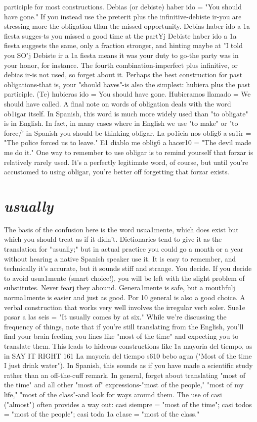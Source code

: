 \documentclass[14pt,a4paper,oneside]{memoir}
\begin{document}
{{{{participle for most constructions. Debias (or debiste) haber ido =
"You should have gone." If you instead use the preterit plus the infinitive-debiste ir-you are stressing more the obligation tllan the
missed opportunity. Debias haber ido a 1a fiesta sugges-ts you missed a
good time at the partYj Debiste haber ido a 1a fiesta suggests the same,
only a fraction stronger, and hinting maybe at "I told you SO"j Debiste
ir a 1a fiesta means it was your duty to go-the party was in your
honor, for instance. The fourth combination-imperfect plus infinitive, or debias ir-is not used, so forget about it. Perhaps the best construction for past obligations-that is, your "should haves"-is also
the simplest: hubiera plus the past participle. (Te) hubieras ido = You
should have gone. Hubieramos llamado = We should have called.
A final note on words of obligation deals with the word ob1igar itself. In Spanish, this word is much more widely used than "to
obligate" is in English. In fact, in many cases where in English we use
"to make" or "to force/' in Spanish you should be thinking obligar. La
po1icia nos oblig6 a sa1ir = "The police forced us to leave." E1 diablo
me oblig6 a hacer10 = "The devil made me do it." One way to remember to use obligar is to remind yourself that forzar is relatively rarely
used. It's a perfectly legitimate word, of course, but until you're accustomed to using obligar, you're better off forgetting that forzar exists.

\section{\emph{usually}}

The basis of the confusion here is the word usua1mente,
which does exist but which you should treat as if it didn't. Dictionaries tend to give it as the translation for "usually;" but in actual practice you could go a month or a year without hearing a native Spanish
speaker use it. It is easy to remember, and technically it's accurate, but
it sounds stiff and strange. You decide.
If you decide to avoid usua1mente (smart choice!), you will be
left with the slight problem of substitutes. Never fearj they abound.
Genera1mente is safe, but a mouthfulj norma1mente is easier and just
as good. Por 10 general is also a good choice. A verbal construction that
works very well involves the irregular verb soler. Sue1e pasar a las seis
= "It usually comes by at six."
While we're discussing the frequency of things, note that if
you're still translating from the English, you'll find your brain feeding
you lines like "most of the time" and expecting you to translate them.
This leads to hideous constructions like 1a mayoria del tiempo, as in
SAY IT RIGHT 161
La mayoria del tiempo s610 bebo agua ("Most of the time I just drink
water"). In Spanish, this sounds as if you have made a scientific study
rather than an off-the-cuff remark. In general, forget about translating
"most of the time" and all other "most of" expressions-"most of the
people," "most of my life," "most of the class"-and look for ways
around them. The use of casi ("almost") often provides a way out: casi
siempre = "most of the time"; casi todos = "most of the people";
casi toda 1a c1ase = "most of the class."

}}}}
\end{document}
